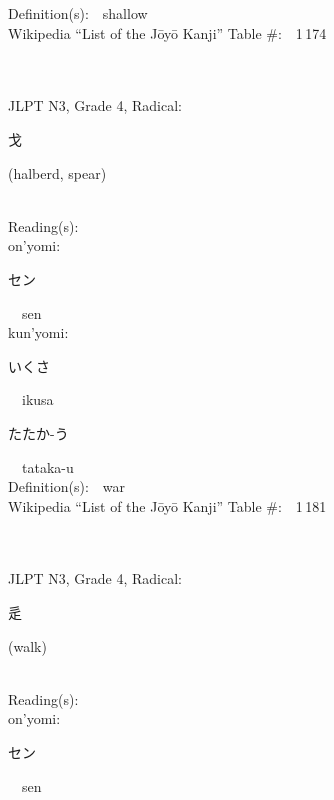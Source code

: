 \begin{multicols}{2}
Definition(s):\ \ shallow \\
Wikipedia ``List of the J\=oy\=o Kanji'' Table \#:\ \ 1\,174 \\
\ \ \\
{\fontsize{34pt}{40pt}  }\ \ \\  %
{JLPT N3, Grade 4, Radical:\ \ {\begin{CJK}{UTF8}{min} 戈 \end{CJK}} (halberd, spear) } \\
Reading(s):\ \ \\
{\hspace*{1em}}on'yomi:\ \ \\
{\hspace*{2em}}{\begin{CJK}{UTF8}{min} セン \end{CJK}}\ \ sen\ \ \\
{\hspace*{1em}}kun'yomi:\ \ \\
{\hspace*{2em}}{\begin{CJK}{UTF8}{min} いくさ \end{CJK}}\ \ ikusa\ \ \\
{\hspace*{2em}}{\begin{CJK}{UTF8}{min} たたか-う \end{CJK}}\ \ tataka-u\ \ \\
Definition(s):\ \ war \\
Wikipedia ``List of the J\=oy\=o Kanji'' Table \#:\ \ 1\,181 \\
\ \ \\
{\fontsize{34pt}{40pt}  }\ \ \\  %
{JLPT N3, Grade 4, Radical:\ \ {\begin{CJK}{UTF8}{min} 辵 \end{CJK}} (walk) } \\
Reading(s):\ \ \\
{\hspace*{1em}}on'yomi:\ \ \\
{\hspace*{2em}}{\begin{CJK}{UTF8}{min} セン \end{CJK}}\ \ sen\ \ \\

\end{multicols}
